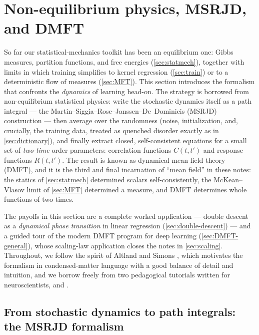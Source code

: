 \documentclass[11pt]{article}
\begin{document}
\section{Non-equilibrium physics, MSRJD, and DMFT}
\label{sec:DMFT}

So far our statistical-mechanics toolkit has been an equilibrium one: Gibbs measures, partition functions, and free energies (\cref{sec:statmech}), together with limits in which training simplifies to kernel regression (\cref{sec:train}) or to a deterministic flow of measures (\cref{sec:MFT}). This section introduces the formalism that confronts the \emph{dynamics} of learning head-on. The strategy is borrowed from non-equilibrium statistical physics: write the stochastic dynamics itself as a path integral --- the Martin--Siggia--Rose--Janssen--De~Dominicis (MSRJD) construction --- then average over the randomness (noise, initialization, and, crucially, the training data, treated as quenched disorder exactly as in \cref{sec:dictionary}), and finally extract closed, self-consistent equations for a small set of \emph{two-time} order parameters: correlation functions $C(t,t')$ and response functions $R(t,t')$. The result is known as dynamical mean-field theory (DMFT), and it is the third and final incarnation of ``mean field'' in these notes: the statics of \cref{sec:statmech} determined scalars self-consistently, the McKean--Vlasov limit of \cref{sec:MFT} determined a measure, and DMFT determines whole functions of two times.

The payoffs in this section are a complete worked application --- double descent as a \emph{dynamical phase transition} in linear regression (\cref{sec:double-descent}) --- and a guided tour of the modern DMFT program for deep learning (\cref{sec:DMFT-general}), whose scaling-law application closes the notes in \cref{sec:scaling}. Throughout, we follow the spirit of Altland and Simons \cite{altlandCondensedMatterField2010}, which motivates the formalism in condensed-matter language with a good balance of detail and intuition, and we borrow freely from two pedagogical tutorials written for neuroscientists, \cite{chowPathIntegralMethods2012} and \cite{stapmannsSelfconsistentFormulationsStochastic2020}.

\subsection{From stochastic dynamics to path integrals: the MSRJD formalism}
\label{sec:MSRJD}
\end{document}
